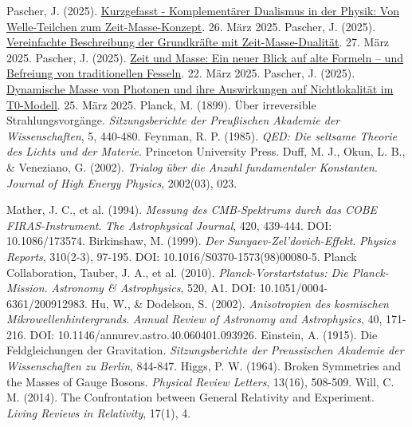 \documentclass[12pt,a4paper]{article}
\begin{document}
\begin{thebibliography}{99}
		 Pascher, J. (2025). \href{https://github.com/jpascher/T0-Time-Mass-Duality/tree/main/2/pdf/Deutsch/Kurzgefasst\%20-\%20Komplement\%C3\%A4rer\%20Dualismus\%20in\%20der\%20Physik\%20-\%20Von\%20Welle-Teilchen\%20zum\%20Zeit-Masse-Konzept.pdf}{Kurzgefasst - Komplementärer Dualismus in der Physik: Von Welle-Teilchen zum Zeit-Masse-Konzept}. 26. März 2025.
		 Pascher, J. (2025). \href{https://github.com/jpascher/T0-Time-Mass-Duality/tree/main/2/pdf/Deutsch/Vereinfachte\%20Beschreibung\%20der\%20vier\%20Grundkr\%C3\%A4fte\%20mit\%20Zeit-Masse-Dualit\%C3\%A4t.pdf}{Vereinfachte Beschreibung der Grundkräfte mit Zeit-Masse-Dualität}. 27. März 2025.
		 Pascher, J. (2025). \href{https://github.com/jpascher/T0-Time-Mass-Duality/tree/main/2/pdf/Deutsch/Zeit\%20und\%20Masse\%20Ein\%20neuer\%20Blick\%20auf\%20alte\%20Formeln\%20\%E2\%80\%93\%20und\%20die\%20Befreiung\%20von\%20traditionellen\%20Fesseln.pdf}{Zeit und Masse: Ein neuer Blick auf alte Formeln – und Befreiung von traditionellen Fesseln}. 22. März 2025.
		 Pascher, J. (2025). \href{https://github.com/jpascher/T0-Time-Mass-Duality/tree/main/2/pdf/Deutsch/Dynamische\%20Masse\%20von\%20Photonen\%20und\%20ihre\%20Implikationen\%20f\%C3\%BCr\%20Nichtlokalit\%C3\%A4t.pdf}{Dynamische Masse von Photonen und ihre Auswirkungen auf Nichtlokalität im T0-Modell}. 25. März 2025.
		 Planck, M. (1899). Über irreversible Strahlungsvorgänge. \textit{Sitzungsberichte der Preußischen Akademie der Wissenschaften}, 5, 440-480.
		 Feynman, R. P. (1985). \textit{QED: Die seltsame Theorie des Lichts und der Materie}. Princeton University Press.
		 Duff, M. J., Okun, L. B., \& Veneziano, G. (2002). \textit{Trialog über die Anzahl fundamentaler Konstanten}. \textit{Journal of High Energy Physics}, 2002(03), 023.
		
		
		 Mather, J. C., et al. (1994). \textit{Messung des CMB-Spektrums durch das COBE FIRAS-Instrument}. \textit{The Astrophysical Journal}, 420, 439-444. DOI: 10.1086/173574.
		 Birkinshaw, M. (1999). \textit{Der Sunyaev-Zel'dovich-Effekt}. \textit{Physics Reports}, 310(2-3), 97-195. DOI: 10.1016/S0370-1573(98)00080-5.
		 Planck Collaboration, Tauber, J. A., et al. (2010). \textit{Planck-Vorstartstatus: Die Planck-Mission}. \textit{Astronomy \& Astrophysics}, 520, A1. DOI: 10.1051/0004-6361/200912983.
		 Hu, W., \& Dodelson, S. (2002). \textit{Anisotropien des kosmischen Mikrowellenhintergrunds}. \textit{Annual Review of Astronomy and Astrophysics}, 40, 171-216. DOI: 10.1146/annurev.astro.40.060401.093926.
		 Einstein, A. (1915). Die Feldgleichungen der Gravitation. \textit{Sitzungsberichte der Preussischen Akademie der Wissenschaften zu Berlin}, 844-847.
		 Higgs, P. W. (1964). Broken Symmetries and the Masses of Gauge Bosons. \textit{Physical Review Letters}, 13(16), 508-509.
		 Will, C. M. (2014). The Confrontation between General Relativity and Experiment. \textit{Living Reviews in Relativity}, 17(1), 4.
	\end{thebibliography}
	
\end{document}
